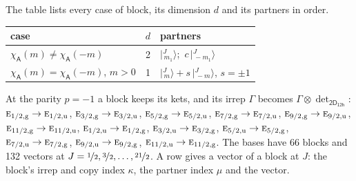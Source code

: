 \documentclass[10pt,a4paper]{article}
\numberwithin{equation}{section}
\newcommand{\grp}[1]{\mathsf{#1}}
\newcommand{\irr}[1]{\text{\normalfont\scshape #1}}
\newcommand{\ptag}[1]{\mathrm{#1}}
\newcommand{\chiA}{\chi_{\grp{A}}}
\newcommand{\irrprod}{\otimes}
\newcommand{\mult}{\kappa}
\newcommand{\intx}{\mu}
\newcommand{\jm}[2]{\bigl\lvert{}^{#1}_{\,#2}\bigr\rangle}
\begin{document}
\leavevmode\label{n:head.case}\label{n:head.partners}The table lists every case of block, its dimension $d$ and its partners in order.
\begin{center}\begin{tabular}{@{}lrl@{}}\toprule
case & $d$ & partners\\\midrule
$\chiA(m) \ne \chiA(-m)$ & 2 & $\jm{J}{m_1}$;\ $c\,\jm{J}{-m_1}$\\
$\chiA(m) = \chiA(-m)$, $m > 0$ & 1 & $\jm{J}{m} + s\,\jm{J}{-m}$, $s = \pm1$\\
\bottomrule\end{tabular}\end{center}
At the parity $p = -1$ a block keeps its kets, and its irrep $\Gamma$ becomes $\Gamma \irrprod \det_{\grp{2D_{12h}}}$: $\irr{e}_{1/2,\ptag{g}} \to \irr{e}_{1/2,\ptag{u}}$, $\irr{e}_{3/2,\ptag{g}} \to \irr{e}_{3/2,\ptag{u}}$, $\irr{e}_{5/2,\ptag{g}} \to \irr{e}_{5/2,\ptag{u}}$, $\irr{e}_{7/2,\ptag{g}} \to \irr{e}_{7/2,\ptag{u}}$, $\irr{e}_{9/2,\ptag{g}} \to \irr{e}_{9/2,\ptag{u}}$, $\irr{e}_{11/2,\ptag{g}} \to \irr{e}_{11/2,\ptag{u}}$, $\irr{e}_{1/2,\ptag{u}} \to \irr{e}_{1/2,\ptag{g}}$, $\irr{e}_{3/2,\ptag{u}} \to \irr{e}_{3/2,\ptag{g}}$, $\irr{e}_{5/2,\ptag{u}} \to \irr{e}_{5/2,\ptag{g}}$, $\irr{e}_{7/2,\ptag{u}} \to \irr{e}_{7/2,\ptag{g}}$, $\irr{e}_{9/2,\ptag{u}} \to \irr{e}_{9/2,\ptag{g}}$, $\irr{e}_{11/2,\ptag{u}} \to \irr{e}_{11/2,\ptag{g}}$.
The bases have 66 blocks and 132 vectors at $J = \nicefrac{1}{2}, \nicefrac{3}{2}, \dots, \nicefrac{21}{2}$. \label{n:head.vector}A row gives a vector of a block at $J$: the block's irrep and copy index $\mult$, the partner index $\intx$ and the vector.
\end{document}
